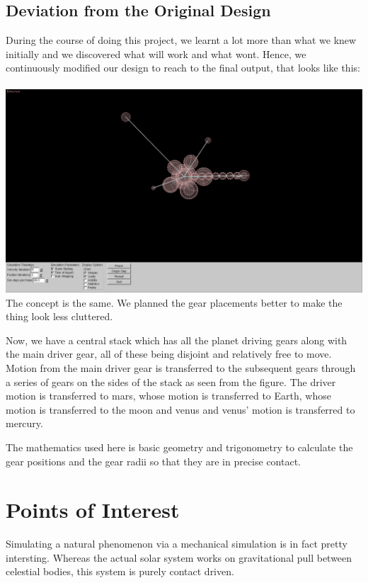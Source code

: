 \documentclass[12pt]{article}
\begin{document}
\subsection{Deviation from the Original Design}
During the course of doing this project, we learnt a lot more than what we knew initially and we discovered what will work and what wont. Hence, we continuously modified our design to reach to the final output, that looks like this:
\\ \\
\includegraphics[scale=0.25]{./img/gui.png}
\\

The concept is the same. We planned the gear placements better to make the thing look less cluttered. 

Now, we have a central stack which has all the planet driving gears along with the main driver gear, all of these being disjoint and relatively free to move. Motion from the main driver gear is transferred to the subsequent gears through a series of gears on the sides of the stack as seen from the figure. The driver motion is transferred to mars, whose motion is transferred to Earth, whose motion is transferred to the moon and venus and venus' motion is transferred to mercury.

The mathematics used here is basic geometry and trigonometry to calculate the gear positions and the gear radii so that they are in precise contact.

\section{Points of Interest}
Simulating a natural phenomenon via a mechanical simulation is in fact pretty intersting. Whereas the actual solar system works on gravitational pull between celestial bodies, this system is purely contact driven. 
\end{document}
